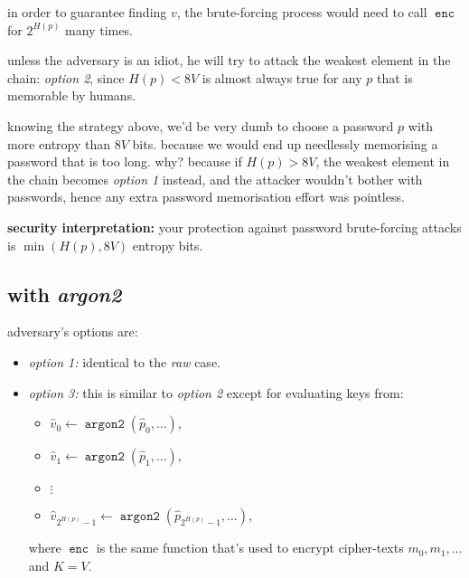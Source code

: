 \documentclass[twocolumn]{article}
\DeclareMathOperator{\enc}{\texttt{enc}}
\DeclareMathOperator{\argon}{\texttt{argon2}}
\begin{document}
\begin{itemize}
    in order to guarantee finding $v$, the brute-forcing process would need
    to call $\enc$ for $2^{H(p)}$ many times.
\end{itemize}

unless the adversary is an idiot, he will try to attack the weakest element
in the chain: \emph{option 2}, since $H(p) < 8V$ is almost always true for
any $p$ that is memorable by humans.

knowing the strategy above, we'd be very dumb to choose a password $p$ with
more entropy than $8V$ bits.  because we would end up needlessly memorising
a password that is too long.  why?  because if $H(p) > 8V$, the weakest
element in the chain becomes \emph{option 1} instead, and the attacker
wouldn't bother with passwords, hence any extra password memorisation
effort was pointless.

\textbf{security interpretation:}  your protection against password
brute-forcing attacks is $\min(H(p), 8V)$ entropy bits.

\subsection{with \emph{argon2}}
adversary's options are:
\begin{itemize}
    \item \emph{option 1:} identical to the \emph{raw} case.
    \item \emph{option 3:} this is similar to \emph{option 2} except for
    evaluating keys from:
    \begin{itemize}
        \item $\hat v_0 \gets \argon(\hat p_0, \ldots)$,
        \item $\hat v_1 \gets \argon(\hat p_1, \ldots)$,
        \item $\vdots$
        \item $\hat v_{2^{H(p)}-1} \gets \argon(\hat p_{2^{H(p)}-1},
        \ldots)$,
    \end{itemize}
    where $\enc$ is the same function that's used to encrypt cipher-texts
    $m_0, m_1, \ldots$ and $K = V$.
\end{itemize}
\end{document}

